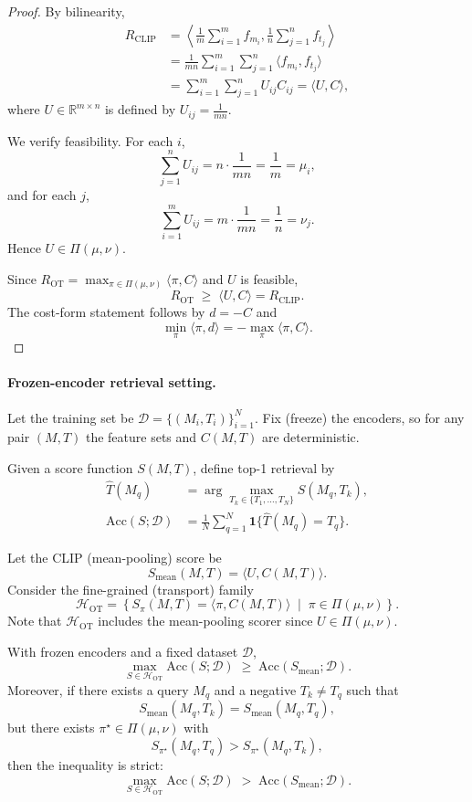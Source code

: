 \begin{proof}
By bilinearity,
\[
\begin{aligned}
R_{\mathrm{CLIP}}
&=
\left\langle
\frac{1}{m}\sum_{i=1}^m f_{m_i},
\frac{1}{n}\sum_{j=1}^n f_{t_j}
\right\rangle \\
&=
\frac{1}{mn}
\sum_{i=1}^m
\sum_{j=1}^n
\langle f_{m_i}, f_{t_j}\rangle \\
&=
\sum_{i=1}^m
\sum_{j=1}^n
U_{ij} C_{ij}
=
\langle U, C\rangle ,
\end{aligned}
\]
where $U\in\mathbb{R}^{m\times n}$ is defined by
$U_{ij}=\frac{1}{mn}$.

We verify feasibility.
For each $i$,
\[
\sum_{j=1}^n U_{ij}
=
n\cdot\frac{1}{mn}
=
\frac{1}{m}
=
\mu_i,
\]
and for each $j$,
\[
\sum_{i=1}^m U_{ij}
=
m\cdot\frac{1}{mn}
=
\frac{1}{n}
=
\nu_j.
\]
Hence $U\in\Pi(\mu,\nu)$.

Since
$R_{\mathrm{OT}}
=
\max_{\pi\in\Pi(\mu,\nu)}
\langle \pi, C\rangle$
and $U$ is feasible,
\[
R_{\mathrm{OT}}
\;\ge\;
\langle U, C\rangle
=
R_{\mathrm{CLIP}}.
\]
The cost-form statement follows by
$d=-C$ and
\[
\min_{\pi}\langle \pi, d\rangle
=
-\max_{\pi}\langle \pi, C\rangle .
\]
\end{proof}

\paragraph{Frozen-encoder retrieval setting.}
Let the training set be
$\mathcal{D}=\{(M_i,T_i)\}_{i=1}^N$.
Fix (freeze) the encoders, so for any pair $(M,T)$
the feature sets and
$C(M,T)$ are deterministic.

Given a score function $S(M,T)$,
define top-1 retrieval by
\[
\begin{aligned}
\widehat{T}(M_q)
&=
\arg\max_{T_k\in\{T_1,\dots,T_N\}}
S(M_q,T_k), \\
\mathrm{Acc}(S;\mathcal{D})
&=
\frac{1}{N}
\sum_{q=1}^N
\mathbf{1}\{\widehat{T}(M_q)=T_q\}.
\end{aligned}
\]

Let the CLIP (mean-pooling) score be
\[
S_{\mathrm{mean}}(M,T)
=
\langle U, C(M,T)\rangle .
\]
Consider the fine-grained (transport) family
\[
\mathcal{H}_{\mathrm{OT}}
=
\left\{
S_{\pi}(M,T)
=
\langle \pi, C(M,T)\rangle
\;\middle|\;
\pi\in\Pi(\mu,\nu)
\right\}.
\]
Note that
$\mathcal{H}_{\mathrm{OT}}$
includes the mean-pooling scorer since
$U\in\Pi(\mu,\nu)$.

\begin{theorem}
\label{thm:acc_superset}
With frozen encoders and a fixed dataset
$\mathcal{D}$,
\[
\max_{S\in\mathcal{H}_{\mathrm{OT}}}
\mathrm{Acc}(S;\mathcal{D})
\;\ge\;
\mathrm{Acc}(S_{\mathrm{mean}};\mathcal{D}).
\]
Moreover, if there exists a query $M_q$
and a negative $T_k\neq T_q$ such that
\[
S_{\mathrm{mean}}(M_q,T_k)
=
S_{\mathrm{mean}}(M_q,T_q),
\]
but there exists
$\pi^\star\in\Pi(\mu,\nu)$
with
\[
S_{\pi^\star}(M_q,T_q)
>
S_{\pi^\star}(M_q,T_k),
\]
then the inequality is strict:
\[
\max_{S\in\mathcal{H}_{\mathrm{OT}}}
\mathrm{Acc}(S;\mathcal{D})
\;>\;
\mathrm{Acc}(S_{\mathrm{mean}};\mathcal{D}).
\]
\end{theorem}

